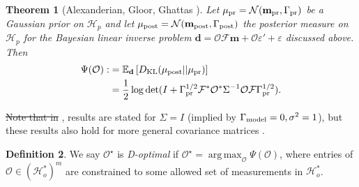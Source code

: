 \documentclass[ba]{imsart}
\newcommand{\eps}{\varepsilon}
\newcommand{\hilp}{\mathcal{H}_p}
\newcommand{\hilo}{\mathcal{H}_o}
\newcommand{\obs}{\mathcal{O}}
\newcommand{\fwd}{\mathcal{F}}
\newcommand{\tar}{\Psi}
\DeclareMathOperator*{\argmax}{arg\,max}
\newcommand{\data}{\mathbf{d}}
\newcommand{\param}{\mathbf{m}}
\newcommand{\normal}{\mathcal{N}}
\newcommand{\pr}{\mu_{\textup{pr}}} \newcommand{\post}{\mu_{\textup{post}}} \newcommand{\prmean}{\param_{\textup{pr}}} \newcommand{\postmean}{\param_{\textup{post}}} \newcommand{\postcov}{\Gamma_{\textup{post}}} \newcommand{\prcov}{\Gamma_{\textup{pr}}} \newcommand{\modcov}{\Gamma_{\textup{model}}} \newcommand{\tmp}{\mathcal{G}}
\newcommand{\opt}{\mathcal{D}}
\theoremstyle{plain}
\newtheorem{theorem}{Theorem}
\theoremstyle{definition}
\newtheorem{definition}[theorem]{Definition}
\theoremstyle{remark}
\providecommand{\DIFaddtex}[1]{{\protect\color{blue}\uwave{#1}}} %
\providecommand{\DIFdeltex}[1]{{\protect\color{red}\sout{#1}}}                      %
\providecommand{\DIFaddbegin}{} %
\providecommand{\DIFaddend}{} %
\providecommand{\DIFdelbegin}{} %
\providecommand{\DIFdelend}{} %
\providecommand{\DIFadd}[1]{\texorpdfstring{\DIFaddtex{#1}}{#1}} %
\providecommand{\DIFdel}[1]{\texorpdfstring{\DIFdeltex{#1}}{}} %
\newcommand{\DIFscaledelfig}{0.5}
\newlength{\DIFdelgraphicswidth} %
\newlength{\DIFdelgraphicsheight} %
\newcommand{\DIFaddincludegraphics}[2][]{{\color{blue}\fbox{\DIFOincludegraphics[#1]{#2}}}} %
\newcommand{\DIFdelincludegraphics}[2][]{%
\sbox{\DIFdelgraphicsbox}{\DIFOincludegraphics[#1]{#2}}%
\settoboxwidth{\DIFdelgraphicswidth}{\DIFdelgraphicsbox} %
\settoboxtotalheight{\DIFdelgraphicsheight}{\DIFdelgraphicsbox} %
\scalebox{\DIFscaledelfig}{%
\parbox[b]{\DIFdelgraphicswidth}{\usebox{\DIFdelgraphicsbox}\\[-\baselineskip] \rule{\DIFdelgraphicswidth}{0em}}\llap{\resizebox{\DIFdelgraphicswidth}{\DIFdelgraphicsheight}{%
\setlength{\unitlength}{\DIFdelgraphicswidth}%
\begin{picture}(1,1)%
\thicklines\linethickness{2pt} %
{\color[rgb]{1,0,0}\put(0,0){\framebox(1,1){}}}%
{\color[rgb]{1,0,0}\put(0,0){\line( 1,1){1}}}%
{\color[rgb]{1,0,0}\put(0,1){\line(1,-1){1}}}%
\end{picture}%
}\hspace*{3pt}}} %
} %
\DeclareRobustCommand{\DIFaddbegin}{\DIFOaddbegin \let\includegraphics\DIFaddincludegraphics} %
\DeclareRobustCommand{\DIFaddend}{\DIFOaddend \let\includegraphics\DIFOincludegraphics} %
\DeclareRobustCommand{\DIFdelbegin}{\DIFOdelbegin \let\includegraphics\DIFdelincludegraphics} %
\DeclareRobustCommand{\DIFdelend}{\DIFOaddend \let\includegraphics\DIFOincludegraphics} %
\begin{document}
\begin{theorem}[Alexanderian, Gloor, Ghattas \cite{AlexanderianGloorGhattas14}]\label{thm:d_optimality}
  Let \(\pr = \normal(\prmean,\prcov)\) be a Gaussian prior on \(\hilp\)
  and let \(\post = \normal(\postmean,\postcov)\) the posterior measure
  on \(\hilp\) for the Bayesian linear inverse problem \(\data = \obs
  \fwd\param + \obs \eps' + \eps\) discussed above. Then
  \DIFdelbegin %
\DIFdelend \DIFaddbegin \begin{align}\label{eq:objective}
    \begin{split}
      \tar( \obs) :&= \mathbb{E}_{\data}\left [ D_{\text{KL}} (\post || \pr ) \right ] \\
&= \frac{1}{2} \log \det 
      ( I + \prcov^{1/2}  \fwd ^* \obs^* \Sigma^{-1} \obs \fwd \prcov^{1/2}).
    \end{split}
  \end{align}\DIFaddend 
\end{theorem}

\DIFdelbegin \DIFdel{Note that in }\DIFdelend \DIFaddbegin \DIFadd{In }\DIFaddend \cite{AlexanderianGloorGhattas14, alexanderian2018efficient},
results are stated for \(\Sigma=I\) (implied by \(\modcov =
0,\sigma^2=1\)), but these results also hold for more general
covariance matrices \cite[p. 681]{AlexanderianGloorGhattas14}.

\begin{definition}\label{def:d_optimality}
  We say \DIFdelbegin \DIFdel{\(\obs^{\star}\) }\DIFdelend \DIFaddbegin \DIFadd{\(\opt\) }\DIFaddend is \emph{D-optimal} if \DIFdelbegin \DIFdel{\(\obs^{\star} =
  \argmax_{\obs} \tar(\obs)\)}\DIFdelend \DIFaddbegin \DIFadd{\(\opt =
  \argmax_{\obs} \tar(\obs)\)}\DIFaddend , where entries of \(\obs \in (\hilo^*)^m\)
  are constrained to some allowed set of measurements in \(\hilo^*\).
\end{definition}
\end{document}

